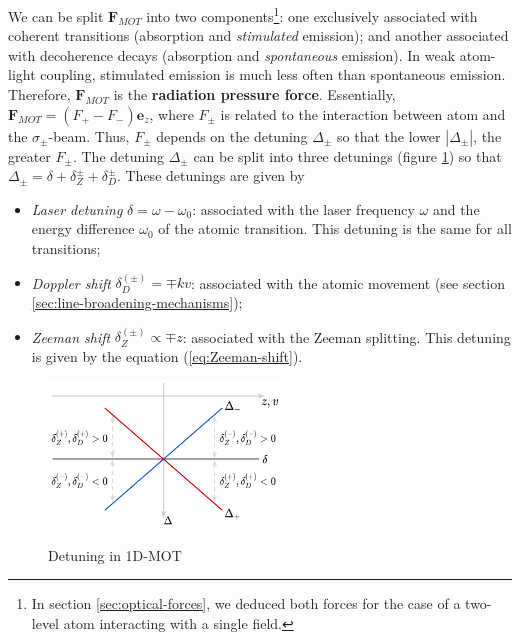 We can be split $ \mathbf{F}_{MOT} $ into two components\footnote{In section \ref{sec:optical-forces}, we deduced both forces for the case of a two-level atom interacting with a single field.}: one exclusively associated with coherent transitions (absorption and \textit{stimulated} emission); and another associated with decoherence decays (absorption and \textit{spontaneous} emission). In weak atom-light coupling, stimulated emission is much less often than spontaneous emission. Therefore, $ \mathbf{F}_{MOT} $ is the \textbf{radiation pressure force}. Essentially, $ \mathbf{F}_{MOT} = (F_{+} - F_{-}) \mathbf{e}_z $, where $ F_{\pm} $ is related to the interaction between atom and the $ \sigma_{\pm} $-beam. Thus, $ F_{\pm} $ depends on the detuning $ \Delta_{\pm} $ so that the lower $ |\Delta_{\pm}| $, the greater $ F_{\pm} $. The detuning $ \Delta_{\pm} $ can be split into three detunings (figure \ref{fig:detuning-1D-MOT}) so that $ \Delta_{\pm} = \delta + \delta_Z^{\pm} + \delta_D^{\pm} $. These detunings are given by
\begin{itemize}
	\item \textit{Laser detuning} $ \delta = \omega - \omega_0 $: associated with the laser frequency $ \omega $ and the energy difference $ \omega_0 $ of the atomic transition. This detuning is the same for all transitions;

	\item \textit{Doppler shift} $ \delta_{D}^{(\pm)} = \mp k v $: associated with the atomic movement (see section \ref{sec:line-broadening-mechanisms});

	\item \textit{Zeeman shift} $ \delta_Z^{(\pm)} \propto \mp z $: associated with the Zeeman splitting. This detuning is given by the equation (\ref{eq:Zeeman-shift}).
\end{itemize}

\begin{figure}[!ht]
	\centering
	\caption{Detuning in 1D-MOT}
	\includegraphics[width=0.55\textwidth]{USPSC-img/1D-MOT-detunings.png}
	\vspace{5pt}
	\label{fig:detuning-1D-MOT}
	\vspace{-20pt}
\end{figure}

